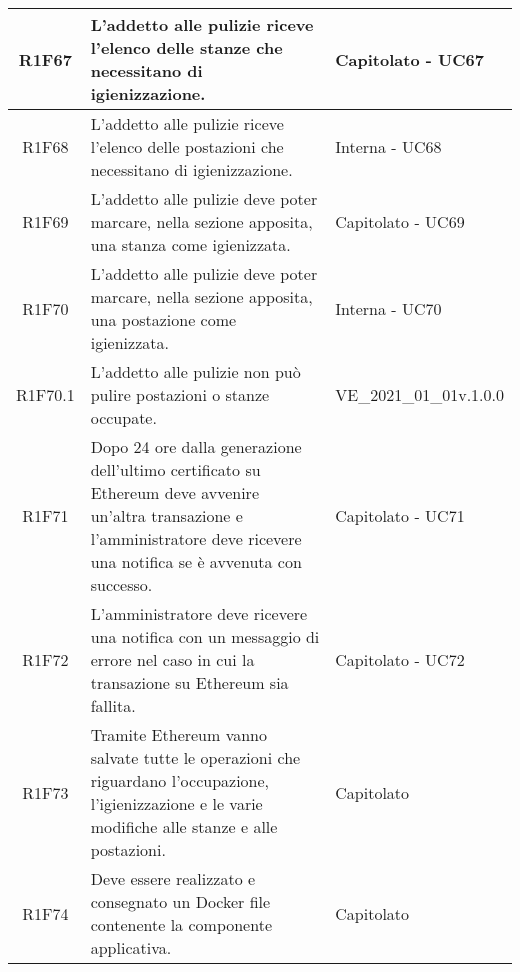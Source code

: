 \begin{center}
\begin{longtable}{|c|p{10cm}|p{4cm}|}
		R1F67&	L'addetto alle pulizie riceve l'elenco delle stanze che necessitano di igienizzazione.& 	Capitolato - UC67\\
		\hline
		R1F68&L'addetto alle pulizie riceve l'elenco delle postazioni che necessitano di igienizzazione.	& Interna - UC68	\\
		\hline
		R1F69&L'addetto alle pulizie deve poter marcare, nella sezione apposita, una stanza come igienizzata.	& Capitolato - UC69	\\
		\hline
		R1F70&L'addetto alle pulizie deve poter marcare, nella sezione apposita, una postazione come igienizzata.	&Interna - UC70 	\\
		\hline
		R1F70.1&L'addetto alle pulizie non può pulire postazioni o stanze occupate.	& VE\_2021\_01\_01v.1.0.0	\\
		\hline
		R1F71&Dopo 24 ore dalla generazione dell'ultimo certificato su Ethereum deve avvenire un'altra transazione e l'amministratore deve ricevere una notifica se è avvenuta con successo.	& Capitolato - UC71	\\
		\hline
		R1F72&L'amministratore deve ricevere una notifica con un messaggio di errore nel caso in cui la transazione su Ethereum sia fallita.	& Capitolato - UC72	\\
		\hline
		R1F73&Tramite Ethereum vanno salvate tutte le operazioni che riguardano l'occupazione, l'igienizzazione e le varie modifiche alle stanze e alle postazioni.	& Capitolato	\\
		\hline
		R1F74 &Deve essere realizzato e consegnato un Docker file contenente la componente applicativa. & Capitolato\\
		\hline
						
	\end{longtable}
\end{center}


